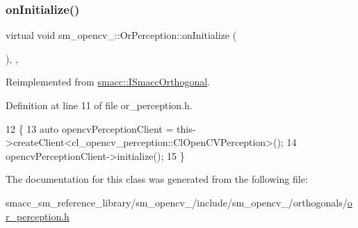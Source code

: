 \subsubsection{\texorpdfstring{on\+Initialize()}{onInitialize()}}
{\footnotesize\ttfamily virtual void sm\+\_\+opencv\+\_\+::\+Or\+Perception\+::on\+Initialize (\begin{DoxyParamCaption}{ }\end{DoxyParamCaption})\hspace{0.3cm}{\ttfamily [inline]}, {\ttfamily [override]}, {\ttfamily [virtual]}}



Reimplemented from \hyperlink{classsmacc_1_1ISmaccOrthogonal_a6bb31c620cb64dd7b8417f8705c79c7a}{smacc\+::\+I\+Smacc\+Orthogonal}.



Definition at line 11 of file or\+\_\+perception.\+h.


\begin{DoxyCode}
12   \{
13     \textcolor{keyword}{auto} opencvPerceptionClient = this->createClient<cl\_opencv\_perception::ClOpenCVPerception>();
14     opencvPerceptionClient->initialize();
15   \}
\end{DoxyCode}


The documentation for this class was generated from the following file\+:\begin{DoxyCompactItemize}
\item 
smacc\+\_\+sm\+\_\+reference\+\_\+library/sm\+\_\+opencv\+\_/include/sm\+\_\+opencv\+\_/orthogonals/\hyperlink{sm__opencv__2_2include_2sm__opencv__2_2orthogonals_2or__perception_8h}{or\+\_\+perception.\+h}\end{DoxyCompactItemize}

